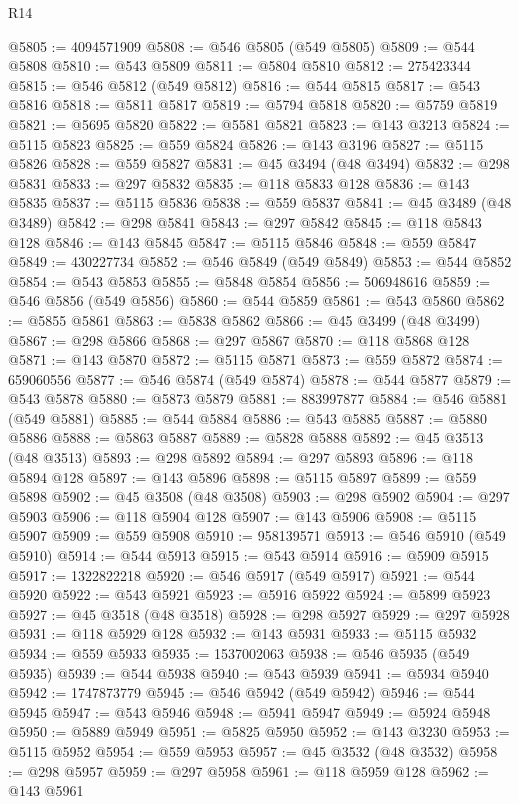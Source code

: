 \begin{lexlean}{R14}
\begin{coremodule}
@5805 := 4094571909
@5808 := @546 @5805 (@549 @5805)
@5809 := @544 @5808
@5810 := @543 @5809
@5811 := @5804 @5810
@5812 := 275423344
@5815 := @546 @5812 (@549 @5812)
@5816 := @544 @5815
@5817 := @543 @5816
@5818 := @5811 @5817
@5819 := @5794 @5818
@5820 := @5759 @5819
@5821 := @5695 @5820
@5822 := @5581 @5821
@5823 := @143 @3213
@5824 := @5115 @5823
@5825 := @559 @5824
@5826 := @143 @3196
@5827 := @5115 @5826
@5828 := @559 @5827
@5831 := @45 @3494 (@48 @3494)
@5832 := @298 @5831
@5833 := @297 @5832
@5835 := @118 @5833 @128
@5836 := @143 @5835
@5837 := @5115 @5836
@5838 := @559 @5837
@5841 := @45 @3489 (@48 @3489)
@5842 := @298 @5841
@5843 := @297 @5842
@5845 := @118 @5843 @128
@5846 := @143 @5845
@5847 := @5115 @5846
@5848 := @559 @5847
@5849 := 430227734
@5852 := @546 @5849 (@549 @5849)
@5853 := @544 @5852
@5854 := @543 @5853
@5855 := @5848 @5854
@5856 := 506948616
@5859 := @546 @5856 (@549 @5856)
@5860 := @544 @5859
@5861 := @543 @5860
@5862 := @5855 @5861
@5863 := @5838 @5862
@5866 := @45 @3499 (@48 @3499)
@5867 := @298 @5866
@5868 := @297 @5867
@5870 := @118 @5868 @128
@5871 := @143 @5870
@5872 := @5115 @5871
@5873 := @559 @5872
@5874 := 659060556
@5877 := @546 @5874 (@549 @5874)
@5878 := @544 @5877
@5879 := @543 @5878
@5880 := @5873 @5879
@5881 := 883997877
@5884 := @546 @5881 (@549 @5881)
@5885 := @544 @5884
@5886 := @543 @5885
@5887 := @5880 @5886
@5888 := @5863 @5887
@5889 := @5828 @5888
@5892 := @45 @3513 (@48 @3513)
@5893 := @298 @5892
@5894 := @297 @5893
@5896 := @118 @5894 @128
@5897 := @143 @5896
@5898 := @5115 @5897
@5899 := @559 @5898
@5902 := @45 @3508 (@48 @3508)
@5903 := @298 @5902
@5904 := @297 @5903
@5906 := @118 @5904 @128
@5907 := @143 @5906
@5908 := @5115 @5907
@5909 := @559 @5908
@5910 := 958139571
@5913 := @546 @5910 (@549 @5910)
@5914 := @544 @5913
@5915 := @543 @5914
@5916 := @5909 @5915
@5917 := 1322822218
@5920 := @546 @5917 (@549 @5917)
@5921 := @544 @5920
@5922 := @543 @5921
@5923 := @5916 @5922
@5924 := @5899 @5923
@5927 := @45 @3518 (@48 @3518)
@5928 := @298 @5927
@5929 := @297 @5928
@5931 := @118 @5929 @128
@5932 := @143 @5931
@5933 := @5115 @5932
@5934 := @559 @5933
@5935 := 1537002063
@5938 := @546 @5935 (@549 @5935)
@5939 := @544 @5938
@5940 := @543 @5939
@5941 := @5934 @5940
@5942 := 1747873779
@5945 := @546 @5942 (@549 @5942)
@5946 := @544 @5945
@5947 := @543 @5946
@5948 := @5941 @5947
@5949 := @5924 @5948
@5950 := @5889 @5949
@5951 := @5825 @5950
@5952 := @143 @3230
@5953 := @5115 @5952
@5954 := @559 @5953
@5957 := @45 @3532 (@48 @3532)
@5958 := @298 @5957
@5959 := @297 @5958
@5961 := @118 @5959 @128
@5962 := @143 @5961

\end{coremodule}
\end{lexlean}
